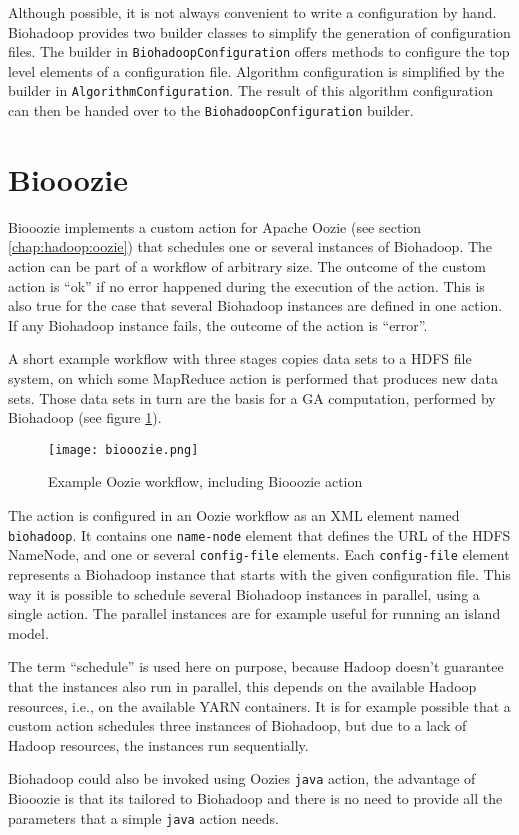 Although possible, it is not always convenient to write a configuration by hand. Biohadoop provides two builder classes to simplify the generation of configuration files. The builder in \texttt{BiohadoopConfiguration} offers methods to configure the top level elements of a configuration file. Algorithm configuration is simplified by the builder in \texttt{AlgorithmConfiguration}. The result of this algorithm configuration can then be handed over to the \texttt{BiohadoopConfiguration} builder.

\section{Biooozie}
\label{chap:impl:oozie}
Biooozie implements a custom action for Apache Oozie (see section \ref{chap:hadoop:oozie}) that schedules one or several instances of Biohadoop. The action can be part of a workflow of arbitrary size. The outcome of the custom action is ``ok'' if no error happened during the execution of the action. This is also true for the case that several Biohadoop instances are defined in one action. If any Biohadoop instance fails, the outcome of the action is ``error''.

A short example workflow with three stages copies data sets to a HDFS file system, on which some MapReduce action is performed that produces new data sets. Those data sets in turn are the basis for a GA computation, performed by Biohadoop (see figure \ref{fig:biooozie}).

\begin{figure}
  \centering
  \texttt{[image: biooozie.png]}
  \caption[Oozie workflow, including Biooozie action]{Example Oozie workflow, including Biooozie action}
  \label{fig:biooozie}
\end{figure}

The action is configured in an Oozie workflow as an XML element named \texttt{biohadoop}. It contains one \texttt{name-node} element that defines the URL of the HDFS NameNode, and one or several \texttt{config-file} elements. Each \texttt{config-file} element represents a Biohadoop instance that starts with the given configuration file. This way it is possible to schedule several Biohadoop instances in parallel, using a single action. The parallel instances are for example useful for running an island model.

The term ``schedule'' is used here on purpose, because Hadoop doesn't guarantee that the instances also run in parallel, this depends on the available Hadoop resources, i.e., on the available YARN containers. It is for example possible that a custom action schedules three instances of Biohadoop, but due to a lack of Hadoop resources, the instances run sequentially.

Biohadoop could also be invoked using Oozies \texttt{java} action, the advantage of Biooozie is that its tailored to Biohadoop and there is no need to provide all the parameters that a simple \texttt{java} action needs. 